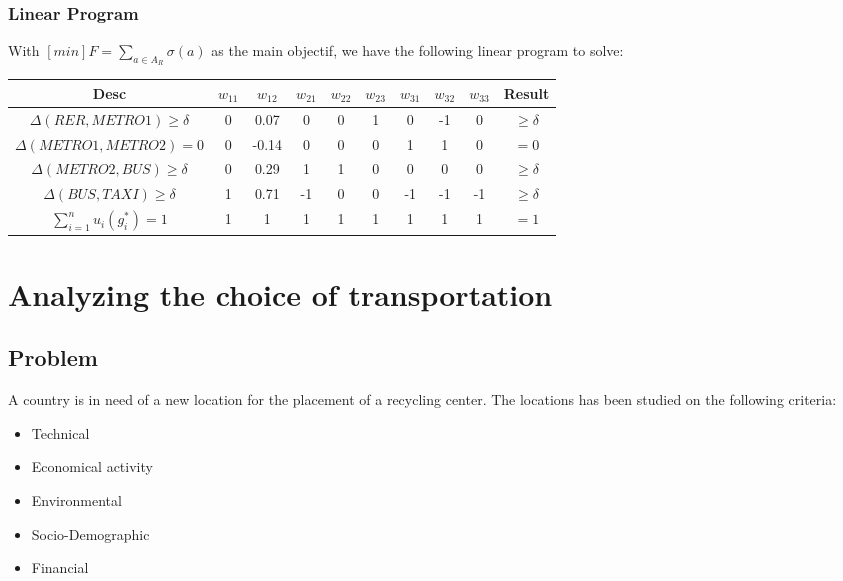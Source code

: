 \documentclass{report}
\begin{document}
\subsubsection{Linear Program}
With $[min]F = \sum_{a \in A_R} \sigma(a) $ as the main objectif, we have the following linear program to solve: 
 
\begin{center}
\begin{tabular}{ |c|c|c|c|c|c|c|c|c|c| } 
\hline Desc & $w_{11}$ & $w_{12}$ & $w_{21}$ & $w_{22}$  & $w_{23}$ & $w_{31}$ & $w_{32}$ & $w_{33}$ & Result  \\ \hline
$\Delta (RER, METRO1)\geq \delta$     & 0 & 0.07  & 0  & 0 & 1 & 0  & -1 & 0 & $\geq \delta$\\
$\Delta (METRO1, METRO2) = 0$         & 0 & -0.14 & 0  & 0 & 0 & 1  & 1  & 0 & $= 0$\\
$\Delta (METRO2, BUS)\geq \delta$     & 0 & 0.29  & 1  & 1 & 0 & 0  & 0   & 0 & $\geq \delta$\\
$\Delta (BUS, TAXI) \geq \delta$          & 1 & 0.71  & -1 & 0 & 0 & -1 & -1 & -1 & $\geq \delta$\\
$\sum_{i=1}^{n} u_i(g_{i}^{*}) = 1$ & 1 & 1       & 1   & 1 & 1 & 1  & 1  & 1 & $= 1$ \\
\hline
\end{tabular}
\end{center}

\section{Analyzing the choice of transportation}
\subsection{Problem}
A country is in need of a new location for the placement of a recycling center. The locations has been studied on the following criteria: 
\begin{itemize}
\item Technical
\item Economical activity  
\item Environmental
\item Socio-Demographic
\item Financial
\end{itemize}
\end{document}
